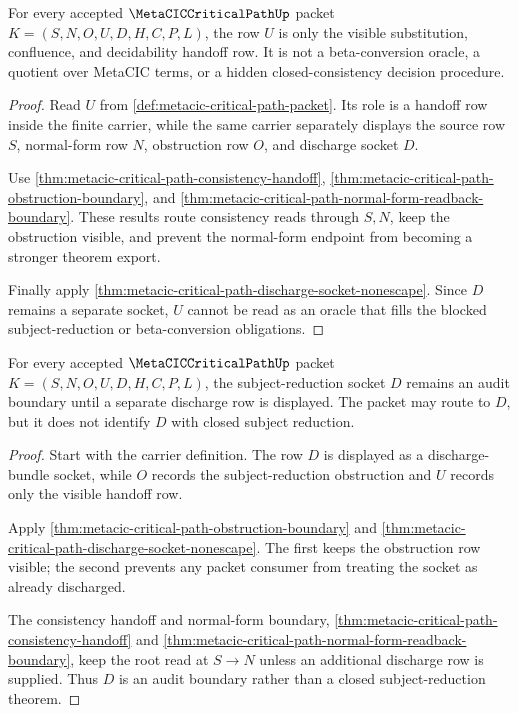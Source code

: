 \begin{theorem}
\label{thm:metacic-critical-path-decidability-handoff-visibility}
For every accepted $\MetaCICCriticalPathUp$ packet $K=(S,N,O,U,D,H,C,P,L)$, the row $U$ is only the visible substitution, confluence, and decidability handoff row. It is not a beta-conversion oracle, a quotient over MetaCIC terms, or a hidden closed-consistency decision procedure.
\end{theorem}
\begin{proof}
Read $U$ from \autoref{def:metacic-critical-path-packet}. Its role is a handoff row inside the finite carrier, while the same carrier separately displays the source row $S$, normal-form row $N$, obstruction row $O$, and discharge socket $D$.

Use \autoref{thm:metacic-critical-path-consistency-handoff}, \autoref{thm:metacic-critical-path-obstruction-boundary}, and \autoref{thm:metacic-critical-path-normal-form-readback-boundary}. These results route consistency reads through $S,N$, keep the obstruction visible, and prevent the normal-form endpoint from becoming a stronger theorem export.

Finally apply \autoref{thm:metacic-critical-path-discharge-socket-nonescape}. Since $D$ remains a separate socket, $U$ cannot be read as an oracle that fills the blocked subject-reduction or beta-conversion obligations.
\end{proof}

\begin{theorem}
\label{thm:metacic-critical-path-subject-reduction-socket-audit-boundary}
For every accepted $\MetaCICCriticalPathUp$ packet $K=(S,N,O,U,D,H,C,P,L)$, the subject-reduction socket $D$ remains an audit boundary until a separate discharge row is displayed. The packet may route to $D$, but it does not identify $D$ with closed subject reduction.
\end{theorem}
\begin{proof}
Start with the carrier definition. The row $D$ is displayed as a discharge-bundle socket, while $O$ records the subject-reduction obstruction and $U$ records only the visible handoff row.

Apply \autoref{thm:metacic-critical-path-obstruction-boundary} and \autoref{thm:metacic-critical-path-discharge-socket-nonescape}. The first keeps the obstruction row visible; the second prevents any packet consumer from treating the socket as already discharged.

The consistency handoff and normal-form boundary, \autoref{thm:metacic-critical-path-consistency-handoff} and \autoref{thm:metacic-critical-path-normal-form-readback-boundary}, keep the root read at $S \to N$ unless an additional discharge row is supplied. Thus $D$ is an audit boundary rather than a closed subject-reduction theorem.
\end{proof}

